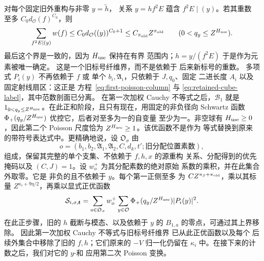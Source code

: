 对每个固定旧外重构与非零 \(y=\widetilde h\)，
关系 \(y=hf^2E\) 蕴含 \(f^2E\mid(y)\)。若其重数
至多 \(C_0d_{\mathcal O}(f)^{C_0}\)，则
\begin{equation}\label{eq:inverse-old-label-fibre}
 \sum_{f^2E\mid(y)}w(f)
 \le C_0d_{\mathcal O}((y))^{C_0+1}
 \le C_{\pi_{\rm old}}Z^{\pi_{\rm old}}
 \qquad(0<q_y\le Z^{H_{\rm use}}).
\end{equation}
最后这个界是一致的，因为 \(H_{\rm use}\) 保持在有界
范围内；\(h=y/(f^2E)\) 于是作为元素被唯一确定。
这是一个旧标号纤维界，而不是依赖于
后来新标号的重数。
多项式 \(P_i(y)\) 不再依赖于 \(f\) 或
单个 \(b_i,\mathfrak A_i\)，只依赖于 \(J,q_0\)、固定
二进长度 \(A_i\) 以及固定射线扇区：这正是
方程~\eqref{eq:first-poisson-column} 与
\eqref{eq:retained-cube-label}，其中范数剖面已分离。
在第一次加权 Cauchy 不等式之后，\(\mathcal B_1\) 就是
\(1_{0<q_y\le Z^{H_{\rm use}}}\)。在此正和阶段，且只有现在，用固定的非负径向 Schwartz 函数
\(\Phi_+(q_y/Z^{H_{\rm use}})\) 优控它，后者对至多为一的自变量
至少为一。非空球有 \(H_{\rm use}\ge0\)，因此第二个 Poisson
尺度恰为 \(Z^{H_{\rm use}}\ge1\)。该优函数不是作为
等式替换到原来的带符号表达式中。更精确地说，设
\(\mathfrak O_\sigma\) 由
\[
 o=(b_1,b_2,\mathfrak A_1,\mathfrak A_2,C,d_k,t';
       \text{旧分配位置素数}),
\]
组成，保留其完整的单个支集、不依赖于 \(f,h,x\) 的源重构
关系、分配得到的优先掩码以及
\((C,J)=1\)。设 \(w_o^+\) 为其分配素数的绝对原始
系数的乘积，并在此集合外取零。它是
非负的且不依赖于 \(y\)。每个第一正侧至多
为 \(C Z^{\pi_\beta+\pi_{\rm old}}\)，乘以其标量
\(Z^{\kappa_i+9\eta/2}\)，再乘以显式正优函数
\begin{equation}\label{eq:inverse-first-majorant}
 \mathcal S_{i,\sigma,\boldsymbol t}
 =\sum_{o\in\mathfrak O_\sigma}w_o^+
    \sum_{y\in\mathcal O}\Phi_+(q_y/Z^{H_{\rm use}})|P_i(y)|^2.
\end{equation}
在此正步骤，旧的 \(h\) 截断与模态、以及依赖于 \(y\) 的
\(B_{1,a}\) 的零点，可通过其上界移除。
因此第一次加权 Cauchy 不等式与旧标号纤维界
已从此正优函数以及每个
后续外集合中移除了旧的 \(f,h\)；它们原来的 \(-V\) 归一化仍留在
\(\kappa_i\) 中。在接下来的计数之后，我们对它的 \(y\)-和
应用第二次 Poisson 变换。
